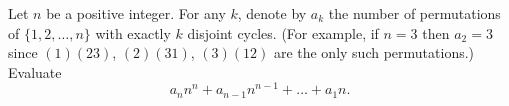 Let $n$ be a positive integer. For any $k$, denote by $a_k$ the number of permutations of $\{1,2,\dots,n\}$ with exactly $k$ disjoint cycles. (For example, if $n=3$ then $a_2=3$ since $(1)(23)$, $(2)(31)$, $(3)(12)$ are the only such permutations.) Evaluate
\[ a_n n^n + a_{n-1} n^{n-1} + \dots + a_1 n. \]